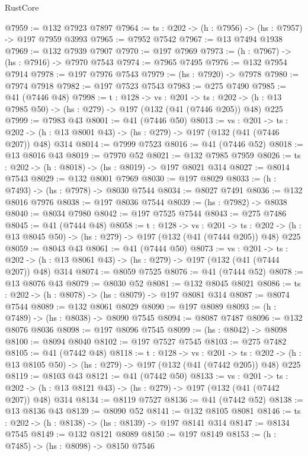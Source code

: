 \begin{lexlean}{RustCore}
\begin{coremodule}
@7959 := @132 @7923 @7897
@7964 := {ts : @202} -> (h : @7956) -> (hs : @7957) -> @197 @7959 @3993
@7965 := @7952 @7542
@7967 := @13 @7494 @1938
@7969 := @132 @7939 @7907
@7970 := @197 @7969
@7973 := (h : @7967) -> (hs : @7916) -> @7970 @7543
@7974 := @7965 @7495
@7976 := @132 @7954 @7914
@7978 := @197 @7976 @7543
@7979 := (hs : @7920) -> @7978
@7980 := @7974 @7918
@7982 := @197 @7523 @7543
@7983 := @275 @7490
@7985 := @41 (@7446 @48)
@7998 := {t : @128} ->
  {vs : @201} ->
  {ts : @202} -> (h : @13 @7985 @50) -> (hs : @279) -> @197 (@132 (@41 (@7446 @205)) @48) @225
@7999 := @7983 @43
@8001 := @41 (@7446 @50)
@8013 := {vs : @201} ->
  {ts : @202} -> (h : @13 @8001 @43) -> (hs : @279) -> @197 (@132 (@41 (@7446 @207)) @48) @314
@8014 := @7999 @7523
@8016 := @41 (@7446 @52)
@8018 := @13 @8016 @43
@8019 := @7970 @52
@8021 := @132 @7985 @7959
@8026 := {ts : @202} -> (h : @8018) -> (hs : @8019) -> @197 @8021 @314
@8027 := @8014 @7543
@8029 := @132 @8001 @7969
@8030 := @197 @8029
@8033 := (h : @7493) -> (hs : @7978) -> @8030 @7544
@8034 := @8027 @7491
@8036 := @132 @8016 @7976
@8038 := @197 @8036 @7544
@8039 := (hs : @7982) -> @8038
@8040 := @8034 @7980
@8042 := @197 @7525 @7544
@8043 := @275 @7486
@8045 := @41 (@7444 @48)
@8058 := {t : @128} ->
  {vs : @201} ->
  {ts : @202} -> (h : @13 @8045 @50) -> (hs : @279) -> @197 (@132 (@41 (@7444 @205)) @48) @225
@8059 := @8043 @43
@8061 := @41 (@7444 @50)
@8073 := {vs : @201} ->
  {ts : @202} -> (h : @13 @8061 @43) -> (hs : @279) -> @197 (@132 (@41 (@7444 @207)) @48) @314
@8074 := @8059 @7525
@8076 := @41 (@7444 @52)
@8078 := @13 @8076 @43
@8079 := @8030 @52
@8081 := @132 @8045 @8021
@8086 := {ts : @202} -> (h : @8078) -> (hs : @8079) -> @197 @8081 @314
@8087 := @8074 @7544
@8089 := @132 @8061 @8029
@8090 := @197 @8089
@8093 := (h : @7489) -> (hs : @8038) -> @8090 @7545
@8094 := @8087 @7487
@8096 := @132 @8076 @8036
@8098 := @197 @8096 @7545
@8099 := (hs : @8042) -> @8098
@8100 := @8094 @8040
@8102 := @197 @7527 @7545
@8103 := @275 @7482
@8105 := @41 (@7442 @48)
@8118 := {t : @128} ->
  {vs : @201} ->
  {ts : @202} -> (h : @13 @8105 @50) -> (hs : @279) -> @197 (@132 (@41 (@7442 @205)) @48) @225
@8119 := @8103 @43
@8121 := @41 (@7442 @50)
@8133 := {vs : @201} ->
  {ts : @202} -> (h : @13 @8121 @43) -> (hs : @279) -> @197 (@132 (@41 (@7442 @207)) @48) @314
@8134 := @8119 @7527
@8136 := @41 (@7442 @52)
@8138 := @13 @8136 @43
@8139 := @8090 @52
@8141 := @132 @8105 @8081
@8146 := {ts : @202} -> (h : @8138) -> (hs : @8139) -> @197 @8141 @314
@8147 := @8134 @7545
@8149 := @132 @8121 @8089
@8150 := @197 @8149
@8153 := (h : @7485) -> (hs : @8098) -> @8150 @7546

\end{coremodule}
\end{lexlean}
